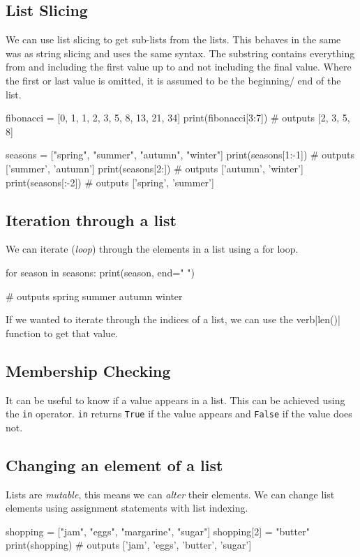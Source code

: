 \subsection*{List Slicing}
We can use list slicing to get sub-lists from the lists. This behaves in the same was as string slicing and uses the same syntax. The substring contains everything from and including the first value up to and not including the final value. Where the first or last value is omitted, it is assumed to be the beginning/ end of the list.
\begin{python}
fibonacci = [0, 1, 1, 2, 3, 5, 8, 13, 21, 34]
print(fibonacci[3:7])
# outputs [2, 3, 5, 8]

seasons = ["spring", "summer", "autumn", "winter"]
print(seasons[1:-1])
# outputs ['summer', 'autumn']
print(seasons[2:])
# outputs ['autumn', 'winter']
print(seasons[:-2])
# outputs ['spring', 'summer']
\end{python}

\subsection*{Iteration through a list}
We can iterate (\textit{loop}) through the elements in a list using a for loop.
\begin{python}
for season in seasons:
    print(season, end=" ")

# outputs spring summer autumn winter
\end{python}

If we wanted to iterate through the indices of a list, we can use the verb|len()| function to get that value.

\subsection*{Membership Checking}
It can be useful to know if a value appears in a list. This can be achieved using the \verb|in| operator. \verb|in| returns \verb|True| if the value appears and \verb|False| if the value does not.

\subsection*{Changing an element of a list}
Lists are \textit{mutable}, this means we can \textit{alter} their elements. We can change list elements using assignment statements with list indexing.
\begin{python}
shopping = ["jam", "eggs", "margarine", "sugar"]
shopping[2] = "butter"
print(shopping)
# outputs ['jam', 'eggs', 'butter', 'sugar']
\end{python}

